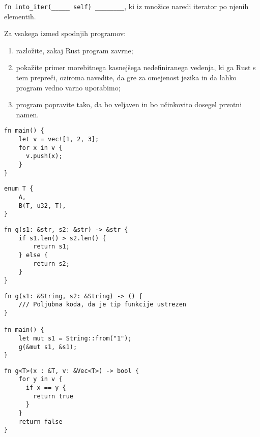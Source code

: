 \documentclass[arhiv]{izpit}
\begin{document}
\podnaloga
\texttt{fn into_iter(_____ self) ________}, ki iz množice naredi iterator po njenih elementih.



\naloga[\tocke{30}]

Za vsakega izmed spodnjih programov:
\begin{enumerate}
  \item razložite, zakaj Rust program zavrne;
  \item pokažite primer morebitnega kasnejšega nedefiniranega vedenja, ki ga Rust s tem prepreči, oziroma navedite, da gre za omejenost jezika in da lahko program vedno varno uporabimo;
  \item program popravite tako, da bo veljaven in bo učinkovito dosegel prvotni namen.
\end{enumerate}

\podnaloga
\begin{verbatim}
fn main() {
    let v = vec![1, 2, 3];
    for x in v {
      v.push(x);
    }
}
\end{verbatim}

\podnaloga
\begin{verbatim}
enum T {
    A,
    B(T, u32, T),
}
\end{verbatim}

\podnaloga
\begin{verbatim}
fn g(s1: &str, s2: &str) -> &str {
    if s1.len() > s2.len() {
        return s1;
    } else {
        return s2;
    }
}
\end{verbatim}

\podnaloga

\begin{verbatim}
fn g(s1: &String, s2: &String) -> () {
    /// Poljubna koda, da je tip funkcije ustrezen
}

fn main() {
    let mut s1 = String::from("1");
    g(&mut s1, &s1);
}
\end{verbatim}

\podnaloga

\begin{verbatim}
fn g<T>(x : &T, v: &Vec<T>) -> bool {
    for y in v {
      if x == y {
        return true
      }
    }
    return false
}
\end{verbatim}
\end{document}
